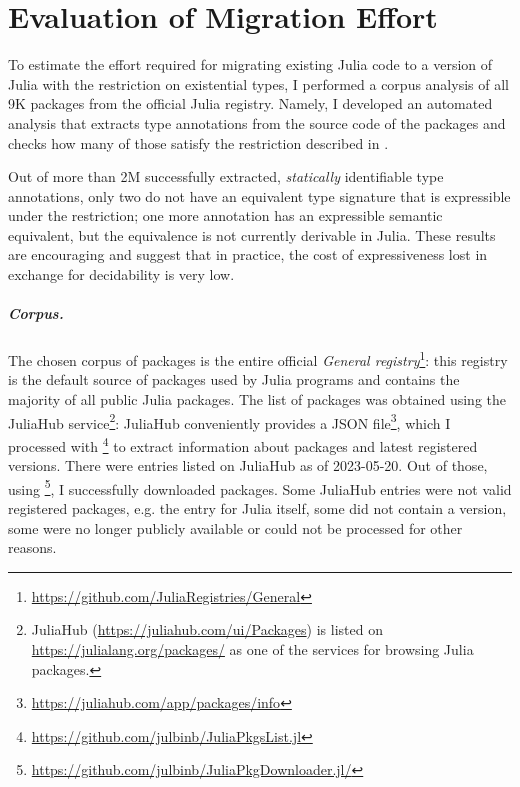 \chapter{Evaluation of Migration Effort}\label{chap:eval}

To estimate the effort required for migrating existing Julia code
to a version of Julia with the restriction on existential types,
I performed a corpus analysis of all 9K packages
from the official Julia registry.
Namely, I developed an automated analysis that extracts type annotations
from the source code of the packages
and checks how many of those satisfy the restriction
described in .

Out of more than 2M successfully extracted, \emph{statically} identifiable
type annotations, only two do not have an equivalent type signature
that is expressible under the restriction;
one more annotation has an expressible semantic equivalent, but the equivalence
is not currently derivable in Julia.
These results are encouraging and suggest that in practice,
the cost of expressiveness lost in exchange for decidability is very low.

\paragraph{Corpus.}
The chosen corpus of packages is the entire official \emph{General
registry}\footnote{\url{https://github.com/JuliaRegistries/General}}:
this registry is the default source of packages used by Julia programs
and contains the majority of all public Julia packages.
The list of packages was obtained using
the JuliaHub service\footnote{
  JuliaHub (\url{https://juliahub.com/ui/Packages}) is listed on
  \url{https://julialang.org/packages/}
  as one of the services for browsing Julia packages.
}:
JuliaHub conveniently provides a JSON file\footnote{
  \url{https://juliahub.com/app/packages/info}
}, which I processed with \footnote{
  \url{https://github.com/julbinb/JuliaPkgsList.jl}
} to extract information about packages and latest registered versions.
There were  entries listed on JuliaHub as of 2023-05-20.
Out of those, using \footnote{
  \url{https://github.com/julbinb/JuliaPkgDownloader.jl/}
}, I successfully downloaded  packages.
Some JuliaHub entries were not valid registered packages,
e.g. the entry for Julia itself, some did not contain a version,
some were no longer publicly available or could not be processed
for other reasons.

